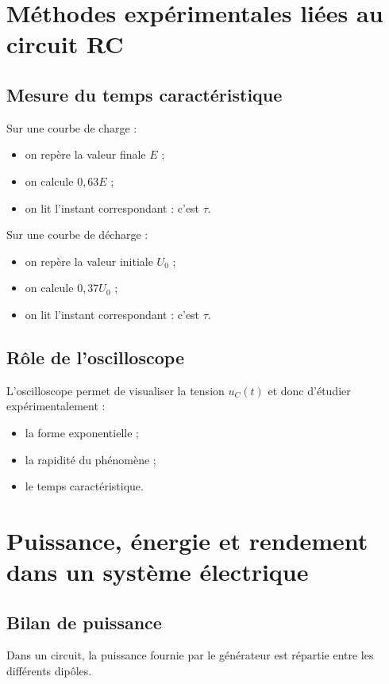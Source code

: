 \documentclass[11pt,a4paper]{article}
\begin{document}
\section{Méthodes expérimentales liées au circuit RC}

\subsection{Mesure du temps caractéristique}

Sur une courbe de charge :
\begin{itemize}
    \item on repère la valeur finale \(E\) ;
    \item on calcule \(0{,}63E\) ;
    \item on lit l'instant correspondant : c'est \(\tau\).
\end{itemize}

Sur une courbe de décharge :
\begin{itemize}
    \item on repère la valeur initiale \(U_0\) ;
    \item on calcule \(0{,}37U_0\) ;
    \item on lit l'instant correspondant : c'est \(\tau\).
\end{itemize}

\subsection{Rôle de l'oscilloscope}

L'oscilloscope permet de visualiser la tension \(u_C(t)\) et donc d'étudier expérimentalement :
\begin{itemize}
    \item la forme exponentielle ;
    \item la rapidité du phénomène ;
    \item le temps caractéristique.
\end{itemize}

\section{Puissance, énergie et rendement dans un système électrique}

\subsection{Bilan de puissance}

Dans un circuit, la puissance fournie par le générateur est répartie entre les différents dipôles.
\end{document}
